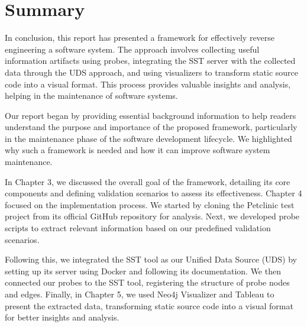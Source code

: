 \section{Summary}

In conclusion, this report has presented a framework for effectively reverse engineering a software system. The approach involves collecting useful information artifacts using probes, integrating the SST server with the collected data through the UDS approach, and using visualizers to transform static source code into a visual format. This process provides valuable insights and analysis, helping in the maintenance of software systems.

Our report began by providing essential background information to help readers understand the purpose and importance of the proposed framework, particularly in the maintenance phase of the software development lifecycle. We highlighted why such a framework is needed and how it can improve software system maintenance.

In Chapter 3, we discussed the overall goal of the framework, detailing its core components and defining validation scenarios to assess its effectiveness. Chapter 4 focused on the implementation process. We started by cloning the Petclinic test project from its official GitHub repository for analysis. Next, we developed probe scripts to extract relevant information based on our predefined validation scenarios. 

Following this, we integrated the SST tool as our Unified Data Source (UDS) by setting up its server using Docker and following its documentation. We then connected our probes to the SST tool, registering the structure of probe nodes and edges. Finally, in Chapter 5, we used Neo4j Visualizer and Tableau to present the extracted data, transforming static source code into a visual format for better insights and analysis.